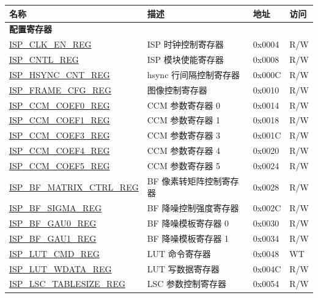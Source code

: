 \begin{longtable}{ | p{6cm} | p{7.2cm} | p{1.3cm} | p{1cm} | }
\hline\rowcolor{lightgray}
{\bfseries 名称} & {\bfseries 描述} &  {\bfseries 地址} & {\bfseries 访问} \\ \hline
\endhead
\multicolumn{4}{|l|}{\textbf{配置寄存器}} \\ \hline
\hyperref[regdesc:ISPCLKENREG]{ISP\_CLK\_EN\_REG} & ISP 时钟控制寄存器 & 0x0004 & R/W \\ \hline
\hyperref[regdesc:ISPCNTLREG]{ISP\_CNTL\_REG} & ISP 模块使能寄存器 & 0x0008 & R/W \\ \hline
\hyperref[regdesc:ISPHSYNCCNTREG]{ISP\_HSYNC\_CNT\_REG} & hsync 行间隔控制寄存器 & 0x000C & R/W \\ \hline
\hyperref[regdesc:ISPFRAMECFGREG]{ISP\_FRAME\_CFG\_REG} & 图像控制寄存器 & 0x0010 & R/W \\ \hline
\hyperref[regdesc:ISPCCMCOEF0REG]{ISP\_CCM\_COEF0\_REG} & CCM 参数寄存器 0 & 0x0014 & R/W \\ \hline
\hyperref[regdesc:ISPCCMCOEF1REG]{ISP\_CCM\_COEF1\_REG} & CCM 参数寄存器 1 & 0x0018 & R/W \\ \hline
\hyperref[regdesc:ISPCCMCOEF3REG]{ISP\_CCM\_COEF3\_REG} & CCM 参数寄存器 3 & 0x001C & R/W \\ \hline
\hyperref[regdesc:ISPCCMCOEF4REG]{ISP\_CCM\_COEF4\_REG} & CCM 参数寄存器 4 & 0x0020 & R/W \\ \hline
\hyperref[regdesc:ISPCCMCOEF5REG]{ISP\_CCM\_COEF5\_REG} & CCM 参数寄存器 5 & 0x0024 & R/W \\ \hline
\hyperref[regdesc:ISPBFMATRIXCTRLREG]{ISP\_BF\_MATRIX\_CTRL\_REG} & BF 像素转矩阵控制寄存器 & 0x0028 & R/W \\ \hline
\hyperref[regdesc:ISPBFSIGMAREG]{ISP\_BF\_SIGMA\_REG} & BF 降噪控制强度寄存器 & 0x002C & R/W \\ \hline
\hyperref[regdesc:ISPBFGAU0REG]{ISP\_BF\_GAU0\_REG} & BF 降噪模板寄存器 0 & 0x0030 & R/W \\ \hline
\hyperref[regdesc:ISPBFGAU1REG]{ISP\_BF\_GAU1\_REG} & BF 降噪模板寄存器 1 & 0x0034 & R/W \\ \hline
\hyperref[regdesc:ISPLUTCMDREG]{ISP\_LUT\_CMD\_REG} & LUT 命令寄存器 & 0x0048 & WT \\ \hline
\hyperref[regdesc:ISPLUTWDATAREG]{ISP\_LUT\_WDATA\_REG} & LUT 写数据寄存器 & 0x004C & R/W \\ \hline
\hyperref[regdesc:ISPLSCTABLESIZEREG]{ISP\_LSC\_TABLESIZE\_REG} & LSC 参数控制寄存器 & 0x0054 & R/W \\ \hline

\end{longtable}
